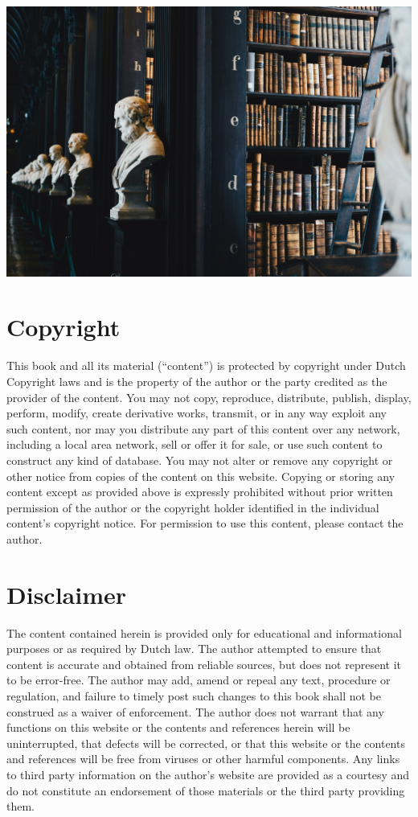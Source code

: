 \documentclass[
]{book}
\begin{document}
\includegraphics[width=1\textwidth,height=\textheight]{img/_headers/licenses.png}

\hypertarget{copyright}{%
\section{Copyright}\label{copyright}}

This book and all its material (``content'') is protected by copyright under Dutch Copyright laws and is the property of the author or the party credited as the provider of the content. You may not copy, reproduce, distribute, publish, display, perform, modify, create derivative works, transmit, or in any way exploit any such content, nor may you distribute any part of this content over any network, including a local area network, sell or offer it for sale, or use such content to construct any kind of database. You may not alter or remove any copyright or other notice from copies of the content on this website. Copying or storing any content except as provided above is expressly prohibited without prior written permission of the author or the copyright holder identified in the individual content's copyright notice. For permission to use this content, please contact the author.

\hypertarget{disclaimer}{%
\section{Disclaimer}\label{disclaimer}}

The content contained herein is provided only for educational and informational purposes or as required by Dutch law. The author attempted to ensure that content is accurate and obtained from reliable sources, but does not represent it to be error-free. The author may add, amend or repeal any text, procedure or regulation, and failure to timely post such changes to this book shall not be construed as a waiver of enforcement. The author does not warrant that any functions on this website or the contents and references herein will be uninterrupted, that defects will be corrected, or that this website or the contents and references will be free from viruses or other harmful components. Any links to third party information on the author's website are provided as a courtesy and do not constitute an endorsement of those materials or the third party providing them.
\end{document}
